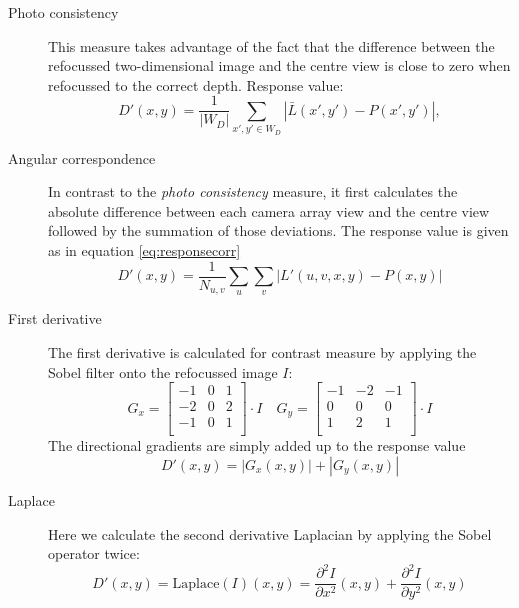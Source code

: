 \documentclass  [
  paper    = a4,
  BCOR     = 10mm,
  twoside,
  fontsize = 12pt,
  fleqn,
  toc      = bibnumbered,
  toc      = listofnumbered,
  numbers  = noendperiod,
  headings = normal,
  listof   = leveldown,
  version  = 3.03
]                                       {scrreprt}
\begin{document}
\begin{description}
	\item[Photo consistency] This measure takes advantage of the fact that the difference between the refocussed two-dimensional image and the centre view is close to zero when refocussed to  the correct depth. Response value:
	\begin{equation}\label{key}
	D'(x,y) = \frac{1}{|W_D|}\sum_{x',y' \in W_D} \left|\bar{L}(x',y')- P(x', y')\right|,
	\end{equation}
	\item[Angular correspondence] In contrast to the \textit{photo consistency} measure, it first calculates the absolute difference between each camera array view and the centre view followed by the summation of those deviations. The response value is given as in equation \eqref{eq:responsecorr}
	\begin{equation}\label{key}
	D'(x,y) = \frac{1}{N_{u,v}}\sum_{u}\sum_{v}  \left|L'(u, v, x, y) - P(x,y)\right|
	\end{equation}
	
	\item[First derivative] The first derivative is calculated for contrast measure by applying the Sobel filter onto the refocussed image $I$:
	\begin{equation}\label{key}
	 G_x=
	 \left[ {\begin{array}{ccc}
	 	-1 & 0 & 1 \\
	 	-2 & 0 & 2 \\
	 	-1 & 0 & 1 \\
	 	\end{array} } \right] \cdot I \quad G_y=
	 \left[ {\begin{array}{ccc}
	 	-1 &-2 &-1 \\
	 	0 & 0 & 0 \\
	 	1 & 2 & 1 \\
	 	\end{array} } \right] \cdot I
	\end{equation} 
	The directional gradients are simply added up to the response value
	\begin{equation}\label{key}
	D'(x,y) = |G_x(x,y)| + |G_y(x,y)|
	\end{equation}
	\item[Laplace] Here we calculate the second derivative Laplacian by applying the Sobel operator twice:\begin{equation}\label{key}
	D'(x,y) = \text{Laplace}(I)(x,y) = \frac{\partial^2 I}{\partial x^2}(x,y) + \frac{\partial^2 I}{\partial y^2}(x,y)
	\end{equation}
\end{description}
\end{document}
